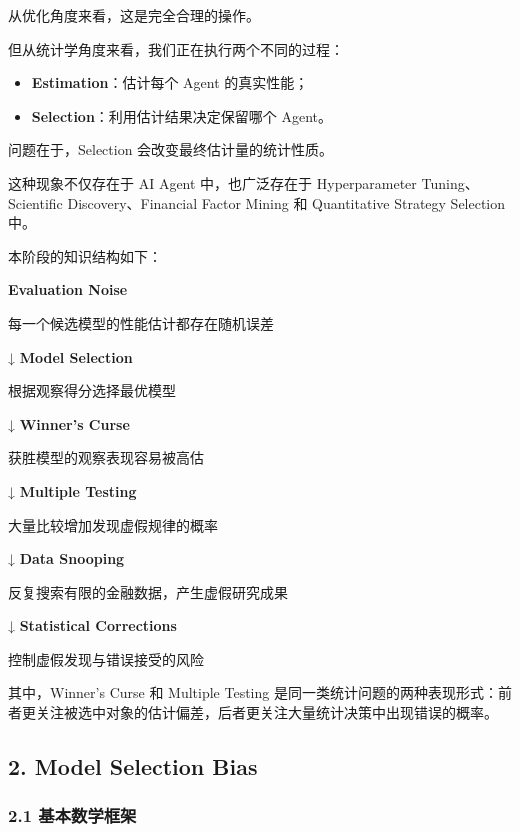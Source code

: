 从优化角度来看，这是完全合理的操作。

但从统计学角度来看，我们正在执行两个不同的过程：

\begin{itemize}
\tightlist
\item
  \textbf{Estimation}：估计每个 Agent 的真实性能；
\item
  \textbf{Selection}：利用估计结果决定保留哪个 Agent。
\end{itemize}

问题在于，Selection 会改变最终估计量的统计性质。

这种现象不仅存在于 AI Agent 中，也广泛存在于 Hyperparameter Tuning、Scientific Discovery、Financial Factor Mining 和 Quantitative Strategy Selection 中。

本阶段的知识结构如下：

\textbf{Evaluation Noise}

每一个候选模型的性能估计都存在随机误差

↓ \textbf{Model Selection}

根据观察得分选择最优模型

↓ \textbf{Winner's Curse}

获胜模型的观察表现容易被高估

↓ \textbf{Multiple Testing}

大量比较增加发现虚假规律的概率

↓ \textbf{Data Snooping}

反复搜索有限的金融数据，产生虚假研究成果

↓ \textbf{Statistical Corrections}

控制虚假发现与错误接受的风险

其中，Winner's Curse 和 Multiple Testing 是同一类统计问题的两种表现形式：前者更关注被选中对象的估计偏差，后者更关注大量统计决策中出现错误的概率。

\hypertarget{part-2-16-0001-model-selection-bias}{%
\subsection{2. Model Selection Bias}\label{part-2-16-0001-model-selection-bias}}

\hypertarget{part-2-16-0001-ux57faux672cux6570ux5b66ux6846ux67b6}{%
\subsubsection{2.1 基本数学框架}\label{part-2-16-0001-ux57faux672cux6570ux5b66ux6846ux67b6}}

